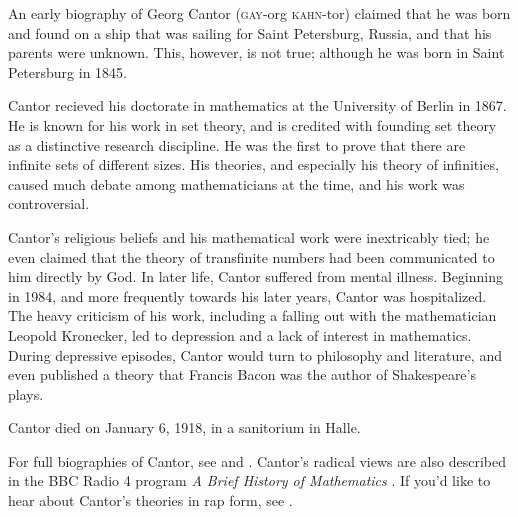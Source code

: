 \documentclass[../../../include/open-logic-section]{subfiles}
\begin{document}



An early biography of Georg Cantor (\textsc{gay}-org
\textsc{kahn}-tor) claimed that he was born and found on a ship that
was sailing for Saint Petersburg, Russia, and that his parents were
unknown. This, however, is not true; although he was born in Saint
Petersburg in 1845.

Cantor recieved his doctorate in mathematics at the University of Berlin in
1867. He is known for his work in set theory, and is credited with founding
set theory as a distinctive research discipline.
He was the first to prove that there are infinite sets of different sizes.
His theories, and especially his theory of infinities, caused much debate
among mathematicians at the time, and his work was controversial.

Cantor's religious beliefs and his mathematical work were inextricably
tied; he even claimed that the theory of transfinite numbers had been
communicated to him directly by God. In later life, Cantor suffered
from mental illness. Beginning in 1984, and more frequently towards
his later years, Cantor was hospitalized.  The heavy criticism of his
work, including a falling out with the mathematician Leopold
Kronecker, led to depression and a lack of interest in
mathematics. During depressive episodes, Cantor would turn to
philosophy and literature, and even published a theory that Francis Bacon
was the author of Shakespeare's plays.

Cantor died on January 6, 1918, in a sanitorium in Halle.

\begin{reading} 
For full biographies of Cantor, see \citet{Dauben1990} and
\citet{Grattan-Guinness1971}.  Cantor's radical views are also
described in the BBC Radio 4 program \emph{A Brief History of
  Mathematics} \citep{Sautoy2014}.  If you'd like to hear about
Cantor's theories in rap form, see \citet{Rose2012}.
\end{reading}
\end{document}
